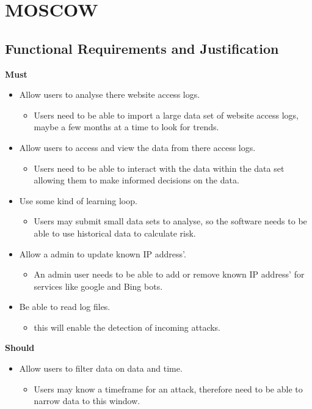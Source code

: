 
\section{MOSCOW} \label{Moscow}
\subsection{Functional Requirements and Justification}
\textbf{Must}
\begin{itemize}
    \item Allow users to analyse there website access logs.
    \begin{itemize}
        \item Users need to be able to import a large data set of website access logs, maybe a few months at a time to look for trends.
    \end{itemize}
    \item Allow users to access and view the data from there access logs.
    \begin{itemize}
        \item Users need to be able to interact with the data within the data set allowing them to make informed decisions on the data.
    \end{itemize}
    \item Use some kind of learning loop.
    \begin{itemize}
        \item Users may submit small data sets to analyse, so the software needs to be able to use historical data to calculate risk.
    \end{itemize}
    \item Allow a admin to update known IP address'.
    \begin{itemize}
        \item An admin user needs to be able to add or remove known IP address' for services like google and Bing bots.
    \end{itemize}
    \item Be able to read log files.
    \begin{itemize}
        \item this will enable the detection of incoming attacks.
    \end{itemize}
\end{itemize}
\textbf{Should}
\begin{itemize}
    \item Allow users to filter data on data and time.
    \begin{itemize}
        \item Users may know a timeframe for an attack, therefore need to be able to narrow data to this window.
    \end{itemize}
\end{itemize}
